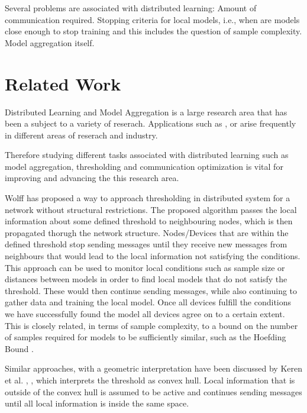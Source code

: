 Several problems are associated with distributed learning:
Amount of communication required.
Stopping criteria for local models, i.e., when are models close enough to stop training and this includes the question of sample complexity.
Model aggregation itself.


\section{Related Work}

Distributed Learning and Model Aggregation is a large research area that has been a subject to a variety of reserach.
Applications such as ,  or  arise frequently in different areas of reserach and industry. 

Therefore studying different tasks associated with distributed learning such as model aggregation, thresholding and communication optimization is vital for improving and advancing the this research area.

Wolff \cite{wolff2013local} has proposed a way to approach thresholding in distributed system for a network without structural restrictions.
The proposed algorithm passes the local information about some defined threshold to neighbouring nodes, which is then propagated thorugh the network structure. Nodes/Devices that are within the defined threshold stop sending messages until they receive new messages from neighbours that would lead to the local information not satisfying the conditions.
This approach can be used to monitor local conditions such as sample size or distances between models in order to find local models that do not satisfy the threshold. These would then continue sending messages, while also continuing to gather data and training the local model. 
Once all devices fulfill the conditions we have successfully found the model all devices agree on to a certain extent. 
This is closely related, in terms of sample complexity, to a bound on the number of samples required for models to be sufficiently similar, such as the Hoefding Bound .

Similar approaches, with a geometric interpretation have been discussed by Keren et al. \cite{sharfman2007geometric}, \cite{keren2011shape}, which interprets the threshold as convex hull. Local information that is outside of the convex hull is assumed to be active and continues sending messages until all local information is inside the same space.

